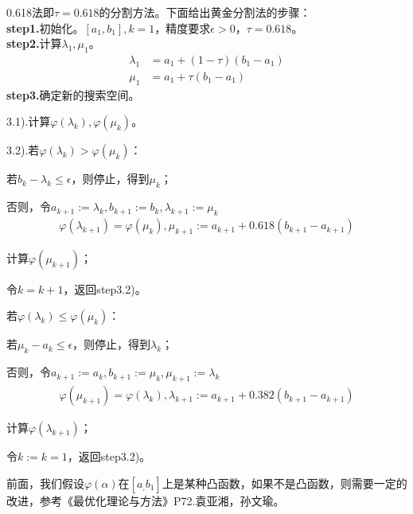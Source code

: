         0.618法即$\tau=0.618$的分割方法。下面给出黄金分割法的步骤：\\
        \textbf{step1.}初始化。$[a_1,b_1],k=1$，精度要求$\epsilon>0$，$\tau=0.618$。\\
        \textbf{step2.}计算${\lambda}_1,{\mu}_1$。
        \begin{align*}
        {\lambda}_1 & =a_1+(1-\tau)(b_1-a_1)\\
        {\mu}_1 & =a_1+\tau(b_1-a_1)
        \end{align*}
        \textbf{step3.}确定新的搜索空间。\par
        3.1).计算$\varphi({\lambda}_k),\varphi({\mu}_k)$。\par
        3.2).若$\varphi({\lambda}_k) > \varphi({\mu}_k)$：\par
            \qquad \qquad 若$b_k-{\lambda}_k \le \epsilon$，则停止，得到${\mu}_k$；\par
            \qquad \qquad 否则，令$a_{k+1} := {\lambda}_k,b_{k+1} := b_k,{\lambda}_{k+1} := {\mu}_k$
            \begin{align*}
            \varphi({\lambda}_{k+1})=\varphi({\mu}_k),{\mu}_{k+1}:=a_{k+1}+0.618(b_{k+1}-a_{k+1})
            \end{align*}
        \par
        \qquad \qquad 计算$\varphi({\mu}_{k+1})$；\par
        \qquad \qquad 令$k=k+1$，返回step3.2)。\par
        \qquad 若$\varphi({\lambda}_{k}) \leqslant \varphi({\mu}_k)$：\par
            \qquad \qquad 若${\mu}_k-a_k \le \epsilon$，则停止，得到${\lambda}_k$；\par
            \qquad \qquad 否则，令$a_{k+1} := a_k,b_{k+1} := {\mu}_k,{\mu}_{k+1} := {\lambda}_k$
            \begin{align*}
            \varphi({\mu}_{k+1})=\varphi({\lambda}_k),{\lambda}_{k+1}:=a_{k+1}+0.382(b_{k+1}-a_{k+1})
            \end{align*}
            \par
            \qquad \qquad 计算$\varphi({\lambda}_{k+1})$；\par
            \qquad \qquad 令$k:=k=1$，返回step3.2)。\par
        前面，我们假设$\varphi (\alpha)$在$[a_,b_1]$上是某种凸函数，如果不是凸函数，则需要一定的改进，参考《最优化理论与方法》P72.袁亚湘，孙文瑜。
